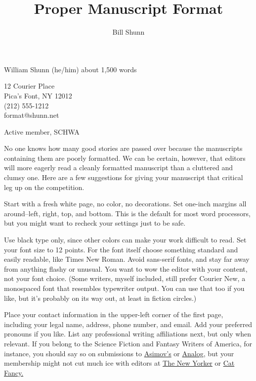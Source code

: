 \documentclass[12pt]{article}
\title{Proper Manuscript Format}
\author{Bill Shunn}
\begin{document}
\raggedright William Shunn (he/him) 
\hfill
\raggedleft about 1,500 words

\raggedright 12 Courier Place \\
Pica’s Font, NY 12012 \\
(212) 555-1212‬ \\
format@shunn.net\\

\linespread{2}\selectfont

Active member, SCHWA

\setlength\parindent{0.5in}
\setlength{\parskip}{0pt}

\let\originalnewpage\newpage
\let\newpage\relax
\maketitle
\let\newpage\originalnewpage

\thispagestyle{empty}

No one knows how many good stories are passed over because
the manuscripts containing them are poorly formatted. We can be
certain, however, that editors will more eagerly read a cleanly
formatted manuscript than a cluttered and clumsy one. Here are a
few suggestions for giving your manuscript that critical leg up
on the competition.

Start with a fresh white page, no color, no decorations.
Set one-inch margins all around--left, right, top, and bottom.
This is the default for most word processors, but you might want
to recheck your settings just to be safe.

Use black type only, since other colors can make your work
difficult to read. Set your font size to 12 points. For the font itself choose something standard and easily readable, like Times New Roman. Avoid sans-serif fonts, and stay far away from
anything flashy or unusual. You want to wow the editor with your
content, not your font choice. (Some writers, myself included,
still prefer Courier New, a monospaced font that resembles
typewriter output. You can use that too if you like, but it’s
probably on its way out, at least in fiction circles.)

Place your contact information in the upper-left corner of
the first page, including your legal name, address, phone number,
and email. Add your preferred pronouns if you like. List any
professional writing affiliations next, but only when relevant.
If you belong to the Science Fiction and Fantasy Writers of
America, for instance, you should say so on submissions to
\underline{Asimov’s} or \underline{Analog,} but your membership might not cut much ice
with editors at \underline{The New Yorker} or \underline{Cat Fancy.}
\end{document}
